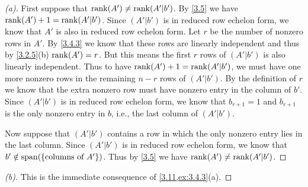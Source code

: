 \begin{proof}[(a)]
  First suppose that \(\rk{A'} \neq \rk{A' | b'}\).
  By \cref{3.5} we have \(\rk{A'} + 1 = \rk{A' | b'}\).
  Since \((A' | b')\) is in reduced row echelon form, we know that \(A'\) is also in reduced row echelon form.
  Let \(r\) be the number of nonzero rows in \(A'\).
  By \cref{3.4.3} we know that these rows are linearly independent and thus by \cref{3.2.5}(b) \(\rk{A'} = r\).
  But this means the first \(r\) rows of \((A' | b')\) is also linearly independent.
  Thus to have \(\rk{A'} + 1 = \rk{A' | b'}\), we must have one more nonzero rows in the remaining \(n - r\) rows of \((A' | b')\).
  By the definition of \(r\) we know that the extra nonzero row must have nonzero entry in the column of \(b'\).
  Since \((A' | b')\) is in reduced row echelon form, we know that \(b_{r + 1} = 1\) and \(b_{r + 1}\) is the only nonzero entry in \(b\), i.e., the last column of \((A' | b')\).

  Now suppose that \((A' | b')\) contains a row in which the only nonzero entry lies in the last column.
  Since \((A' | b')\) is in reduced row echelon form, we know that \(b' \notin \spn{\set{\text{columns of } A'}}\).
  Thus by \cref{3.5} we have \(\rk{A'} \neq \rk{A' | b'}\).
\end{proof}

\begin{proof}[(b)]
  This is the immediate consequence of \cref{3.11,ex:3.4.3}(a).
\end{proof}
